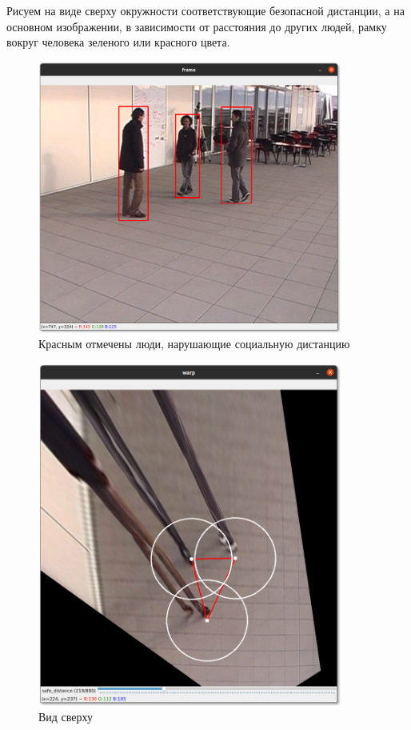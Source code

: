 Рисуем на виде сверху окружности соответствующие безопасной дистанции, а на основном изображении, в зависимости от расстояния до других людей, рамку вокруг человека зеленого или красного цвета.

\begin{figure}[H]
    \centering
    \includegraphics[width=10cm]{images/danger1.png}
    \caption{Красным отмечены люди, нарушающие социальную дистанцию}
    \label{<label>}
\end{figure}

\begin{figure}[H]
    \centering
    \includegraphics[width=10cm]{images/danger2.png}
    \caption{Вид сверху}
    \label{<label>}
\end{figure}
